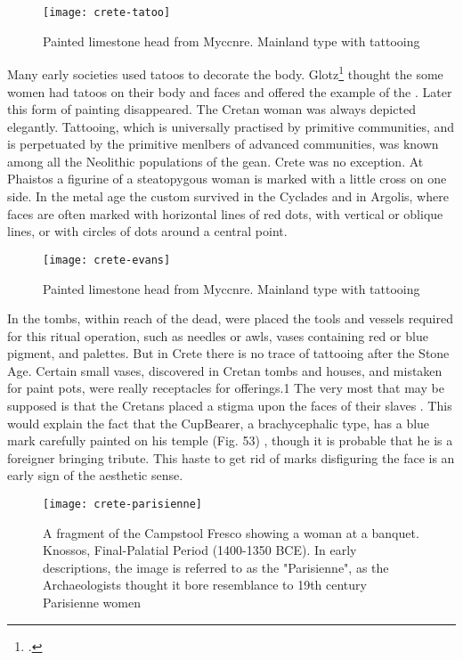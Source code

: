 \begin{figure}[htbp]
\centering
\texttt{[image: crete-tatoo]}
\caption{Painted limestone head from Myccnre. Mainland type with
tattooing}
\end{figure}

Many early societies used tatoos to decorate the body. Glotz\footcite{Glotz2003} thought the some women had tatoos on their body and faces and offered the example of the . Later this form of painting disappeared. The Cretan woman was always depicted elegantly. Tattooing, which is universally practised by primitive
communities, and is perpetuated by the primitive menlbers
of advanced communities, was known among all the Neolithic
populations of the \Ae gean. Crete was no exception. At
Phaistos a figurine of a steatopygous woman is marked with
a little cross on one side. In the metal age the custom
survived in the Cyclades and in Argolis, where faces are often
marked with horizontal lines of red dots, with vertical or
oblique lines, or with circles of dots around a central point.

\begin{figure}[htbp]
\centering
\texttt{[image: crete-evans]}
\caption{Painted limestone head from Myccnre. Mainland type with
tattooing}
\end{figure}


In the tombs, within reach of the dead, were
placed the tools and vessels required for this ritual operation,
such as needles or awls, vases containing red or blue pigment,
and palettes. But in Crete there is no trace of tattooing
after the Stone Age. Certain small vases, discovered in
Cretan tombs and houses, and mistaken for paint pots, were
really receptacles for offerings.1 The very most that may
be supposed is that the Cretans placed a stigma upon the faces
of their slaves . This would explain the fact that the CupBearer,
a brachycephalic type, has a blue mark carefully
painted on his temple (Fig. 53) , though it is probable that
he is a foreigner bringing tribute. This haste to get rid of
marks disfiguring the face is an early sign of the aesthetic
sense.

\begin{figure}[htbp]
\centering
\texttt{[image: crete-parisienne]}
\caption{A fragment of the Campstool Fresco showing a woman at a banquet. Knossos, Final-Palatial Period (1400-1350 BCE). In early descriptions, the image is referred to as the "Parisienne", as the Archaeologists thought it bore resemblance to 19th century Parisienne women}
\end{figure}

